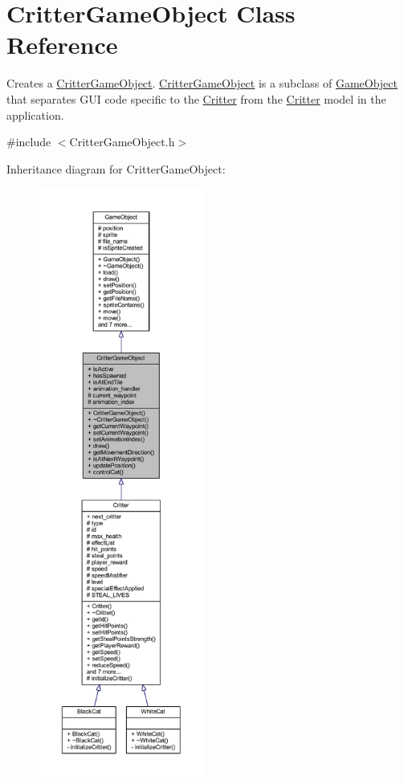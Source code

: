 \hypertarget{class_critter_game_object}{\section{Critter\+Game\+Object Class Reference}
\label{class_critter_game_object}
}


Creates a \hyperlink{class_critter_game_object}{Critter\+Game\+Object}. \hyperlink{class_critter_game_object}{Critter\+Game\+Object} is a subclass of \hyperlink{class_game_object}{Game\+Object} that separates G\+U\+I code specific to the \hyperlink{class_critter}{Critter} from the \hyperlink{class_critter}{Critter} model in the application.  




{\ttfamily \#include $<$Critter\+Game\+Object.\+h$>$}



Inheritance diagram for Critter\+Game\+Object\+:
\nopagebreak
\begin{figure}[H]
\begin{center}
\leavevmode
\includegraphics[height=550pt]{class_critter_game_object__inherit__graph}
\end{center}
\end{figure}



